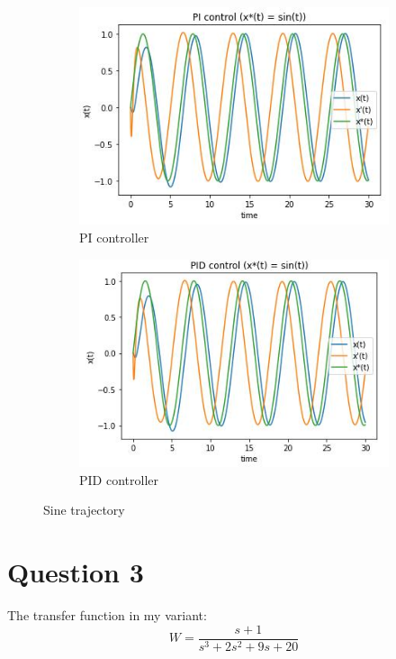 \documentclass[12pt,letterpaper]{article}
\begin{document}
    \begin{figure}[htb]
        \begin{subfigure}{.5\textwidth}
            \centering
            \includegraphics[width=1\linewidth]{images/output/36_0_10-sin.jpg}
            \caption{PI controller}
        \end{subfigure}
        \begin{subfigure}{.5\textwidth}
          \centering
          \includegraphics[width=1\linewidth]{images/output/36_2_9-sin.jpg}
          \caption{PID controller}
        \end{subfigure}
    \caption{Sine trajectory}
    \label{fig:PI_PID_sin}
    \end{figure}

\section*{Question 3}
\label{Q:3}
    The transfer function in my variant:
    \begin{equation*}
        W = \frac{s + 1}{s^3 +2s^2 + 9s + 20}
    \end{equation*}
    
\end{document}
